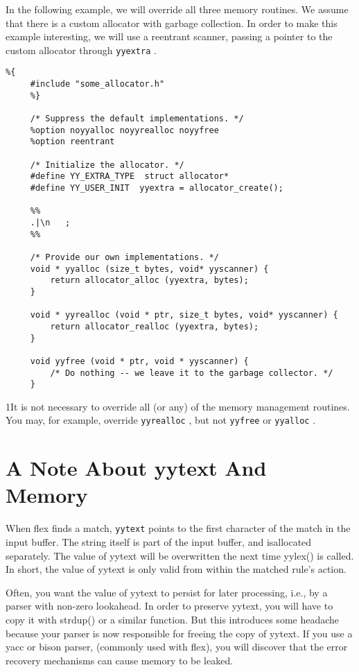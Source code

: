 \documentclass[openany,oneside]{book}
\begin{document}
In the following example, we will override all three memory routines. We assume
that there is a custom allocator with garbage collection. In order to make this
example interesting, we will use a reentrant scanner, passing a pointer to the
custom allocator through \verb`yyextra` .


\begin{verbatim}
%{
     #include "some_allocator.h"
     %}
     
     /* Suppress the default implementations. */
     %option noyyalloc noyyrealloc noyyfree
     %option reentrant
     
     /* Initialize the allocator. */
     #define YY_EXTRA_TYPE  struct allocator*
     #define YY_USER_INIT  yyextra = allocator_create();
     
     %%
     .|\n   ;
     %%
     
     /* Provide our own implementations. */
     void * yyalloc (size_t bytes, void* yyscanner) {
         return allocator_alloc (yyextra, bytes);
     }
     
     void * yyrealloc (void * ptr, size_t bytes, void* yyscanner) {
         return allocator_realloc (yyextra, bytes);
     }
     
     void yyfree (void * ptr, void * yyscanner) {      
         /* Do nothing -- we leave it to the garbage collector. */
     }
\end{verbatim}


1It
is not necessary to override all (or any) of the memory management routines. 
You may, for example, override \verb`yyrealloc` , but not \verb`yyfree` or \verb`yyalloc` .
\section{A Note About yytext And Memory}


When flex finds a match, \verb`yytext` points to the first character of the
match in the input buffer. The string itself is part of the input buffer, and
isallocated separately. The value of yytext will be overwritten the next
time yylex() is called. In short, the value of yytext is only valid from within
the matched rule's action.

Often, you want the value of yytext to persist for later processing, i.e., by a
parser with non-zero lookahead. In order to preserve yytext, you will have to
copy it with strdup() or a similar function. But this introduces some headache
because your parser is now responsible for freeing the copy of yytext. If you
use a yacc or bison parser, (commonly used with flex), you will discover that
the error recovery mechanisms can cause memory to be leaked.
\end{document}
